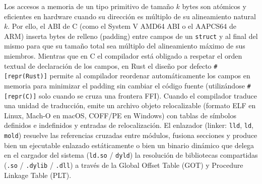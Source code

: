 \documentclass{book}
\begin{document}
Los accesos a memoria de un tipo primitivo de tamaño \(k\) bytes son atómicos y eficientes en hardware cuando su dirección es múltiplo de su alineamiento natural \(k\). Por ello, el ABI de C (como el System V AMD64 ABI o el AAPCS64 de ARM) inserta bytes de relleno (padding) entre campos de un \texttt{struct} y al final del mismo para que su tamaño total sea múltiplo del alineamiento máximo de sus miembros. Mientras que en C el compilador está obligado a respetar el orden textual de declaración de los campos, en Rust el diseño por defecto \texttt{\#[repr(Rust)]} permite al compilador reordenar automáticamente los campos en memoria para minimizar el padding sin cambiar el código fuente (utilizándose \texttt{\#[repr(C)]} solo cuando se cruza una frontera FFI).
Cuando el compilador traduce una unidad de traducción, emite un archivo objeto relocalizable (formato ELF en Linux, Mach-O en macOS, COFF/PE en Windows) con tablas de símbolos definidos e indefinidos y entradas de relocalización. El enlazador (linker: \texttt{lld}, \texttt{ld}, \texttt{mold}) resuelve las referencias cruzadas entre módulos, fusiona secciones y produce bien un ejecutable enlazado estáticamente o bien un binario dinámico que delega en el cargador del sistema (\texttt{ld.so} / \texttt{dyld}) la resolución de bibliotecas compartidas (\texttt{.so} / \texttt{.dylib} / \texttt{.dll}) a través de la Global Offset Table (GOT) y Procedure Linkage Table (PLT).
\end{document}
